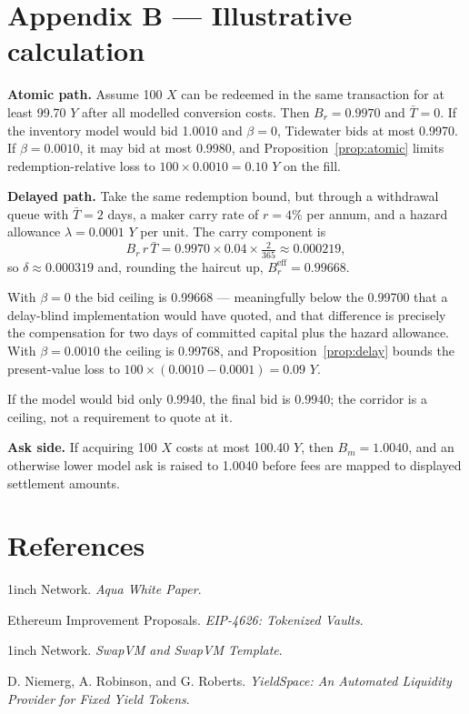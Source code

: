 \documentclass[10pt,twocolumn]{article}
\theoremstyle{definition}
\newcommand{\Br}{B_{r}}
\newcommand{\Bre}{B_{r}^{\mathrm{eff}}}
\newcommand{\Bm}{B_{m}}
\begin{document}
\section*{Appendix B --- Illustrative calculation}

\textbf{Atomic path.} Assume 100 $X$ can be redeemed in the same transaction for at least 99.70 $Y$ after all
modelled conversion costs. Then $\Br = 0.9970$ and $\bar T = 0$. If the inventory model would bid 1.0010 and
$\beta = 0$, Tidewater bids at most 0.9970. If $\beta = 0.0010$, it may bid at most 0.9980, and
Proposition~\ref{prop:atomic} limits redemption-relative loss to $100 \times 0.0010 = 0.10$ $Y$ on the fill.

\medskip
\noindent\textbf{Delayed path.} Take the same redemption bound, but through a withdrawal queue with
$\bar{T} = 2$ days, a maker carry rate of $r = 4\%$ per annum, and a hazard allowance
$\lambda = 0.0001$ $Y$ per unit. The carry component is
\[
  \Br\, r\, \bar T = 0.9970 \times 0.04 \times \tfrac{2}{365} \approx 0.000219,
\]
so $\delta \approx 0.000319$ and, rounding the haircut up, $\Bre = 0.99668$.

With $\beta = 0$ the bid ceiling is 0.99668 --- meaningfully below the 0.99700 that a delay-blind implementation
would have quoted, and that difference is precisely the compensation for two days of committed capital plus the
hazard allowance. With $\beta = 0.0010$ the ceiling is 0.99768, and Proposition~\ref{prop:delay} bounds the
present-value loss to $100 \times (0.0010 - 0.0001) = 0.09$ $Y$.

If the model would bid only 0.9940, the final bid is 0.9940; the corridor is a ceiling, not a requirement to quote
at it.

\medskip
\noindent\textbf{Ask side.} If acquiring 100 $X$ costs at most 100.40 $Y$, then $\Bm = 1.0040$, and an otherwise
lower model ask is raised to 1.0040 before fees are mapped to displayed settlement amounts.

\section*{References}

\begin{enumerate}[label={[\arabic*]}]
  \item 1inch Network. \emph{Aqua White Paper}.
  \item Ethereum Improvement Proposals. \emph{EIP-4626: Tokenized Vaults}.
  \item 1inch Network. \emph{SwapVM and SwapVM Template}.
  \item D. Niemerg, A. Robinson, and G. Roberts. \emph{YieldSpace: An Automated Liquidity Provider for Fixed
        Yield Tokens}.
\end{enumerate}
\end{document}
